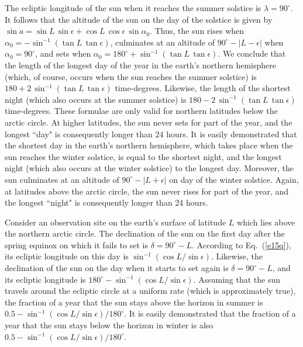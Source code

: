 The ecliptic longitude of the sun when it reaches the summer solstice is
$\lambda = 90^\circ$. It follows that the altitude of the sun on the day of the
solstice is given by $\sin a = \sin L\,\sin \epsilon + \cos L\,\cos\epsilon\,\sin \alpha_0$.
Thus, the sun rises when $\alpha_0=-\sin^{-1}(\tan L\,\tan\epsilon)$, 
culminates at an altitude of $90^\circ - |L- \epsilon|$ when $\alpha_0=90^\circ$, and sets when $\alpha_0=180^\circ + \sin ^{-1}(\tan L\,\tan\epsilon)$. We conclude that the length  of the longest day of the year in the earth's northern hemisphere
(which, of course, occurs when the sun reaches the summer solstice)
is $180 +2\,\sin ^{-1}(\tan L\,\tan\epsilon)$ time-degrees. Likewise, the
length of the shortest night (which also occurs at the summer solstice) is $180-2\, \sin^{-1}(\tan L\,\tan\epsilon)$ time-degrees.
These formulae are only valid for northern latitudes below the arctic circle. 
At higher latitudes, the sun never sets for part of the year, and the longest
``day" is consequently longer than 24 hours. It is easily
demonstrated that the shortest day in the earth's northern hemisphere, which takes place when the sun
reaches the winter solstice, is equal to the shortest night, and the longest
night (which also occurs at the winter solstice) to the longest day. Moreover, the sun
culminates at an altitude of $90^\circ - |L + \epsilon|$  on day of the winter solstice. 
Again, at latitudes above the arctic circle,
the sun never rises for part of the year, and the longest ``night" is
consequently longer than 24 hours. 

Consider an observation  site on the earth's surface of latitude $L$ which lies
above the northern arctic circle. The declination of the sun on the
first day after the spring equinox on which it fails to set is $\delta = 90^\circ - L$. According
to Eq.~(\ref{e15q}), its ecliptic longitude on this day is $\sin ^{-1} (\cos L/\sin \epsilon)$.
Likewise, the declination of the sun on the day  when it starts to  set again
is $\delta = 90^\circ - L$, and its ecliptic longitude is $180^\circ -
\sin^{-1}(\cos L/\sin \epsilon)$. Assuming that the sun
travels around the ecliptic circle at a uniform rate (which is approximately
true), the fraction of a year that the sun stays above the horizon
in summer is $0.5-\sin^{-1}(\cos L/\sin \epsilon)/180^\circ$. It is easily
demonstrated that the fraction of a year that the sun stays
below the horizon in winter is also  $0.5-\sin^{-1}(\cos L/\sin \epsilon)/180^\circ$.

